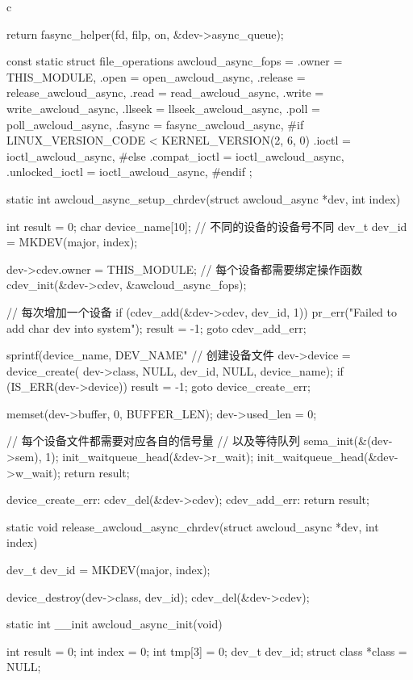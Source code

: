 \begin{code-block}{c}
{{{        return fasync_helper(fd, filp, on, &dev->async_queue);
}

const static struct file_operations awcloud_async_fops = {
        .owner          = THIS_MODULE,
        .open           = open_awcloud_async,
        .release        = release_awcloud_async,
        .read           = read_awcloud_async,
        .write          = write_awcloud_async,
        .llseek         = llseek_awcloud_async,
        .poll           = poll_awcloud_async,
        .fasync         = fasync_awcloud_async,
#if LINUX_VERSION_CODE < KERNEL_VERSION(2, 6, 0)
        .ioctl          = ioctl_awcloud_async,
#else
        .compat_ioctl   = ioctl_awcloud_async,
        .unlocked_ioctl = ioctl_awcloud_async,
#endif
};

static int awcloud_async_setup_chrdev(struct awcloud_async *dev, int index)
{
        int result = 0;
        char device_name[10];
        // 不同的设备的设备号不同
        dev_t dev_id = MKDEV(major, index);

        dev->cdev.owner = THIS_MODULE;
        // 每个设备都需要绑定操作函数
        cdev_init(&dev->cdev, &awcloud_async_fops);

        // 每次增加一个设备
        if (cdev_add(&dev->cdev, dev_id, 1)) {
                pr_err("Failed to add char dev into system\n");
                result = -1;
                goto cdev_add_err;
        }

        sprintf(device_name, DEV_NAME"%
        // 创建设备文件
        dev->device = device_create(
                dev->class, NULL, dev_id, NULL, device_name);
        if (IS_ERR(dev->device)) {
                result = -1;
                goto device_create_err;
        }

        memset(dev->buffer, 0, BUFFER_LEN);
        dev->used_len = 0;

        // 每个设备文件都需要对应各自的信号量
        // 以及等待队列
        sema_init(&(dev->sem), 1);
        init_waitqueue_head(&dev->r_wait);
        init_waitqueue_head(&dev->w_wait);
        return result;

device_create_err:
        cdev_del(&dev->cdev);
cdev_add_err:
        return result;
}

static void release_awcloud_async_chrdev(struct awcloud_async *dev, int index)
{
        dev_t dev_id = MKDEV(major, index);

        device_destroy(dev->class, dev_id);
        cdev_del(&dev->cdev);
}

static int __init awcloud_async_init(void)
{
        int result = 0;
        int index = 0;
        int tmp[3] = {0};
        dev_t dev_id;
        struct class *class = NULL;

}}}
\end{code-block}

